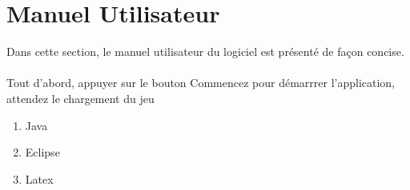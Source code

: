 
\section{Manuel Utilisateur}
\label{sec:manuel}

\noindent Dans cette section, le manuel utilisateur du logiciel est présenté de façon concise.

\paragraph{} Tout d'abord, appuyer sur le bouton Commencez pour démarrrer l'application, attendez le chargement du jeu
\begin{enumerate}
\item Java
\item Eclipse
\item Latex
\end{enumerate}

